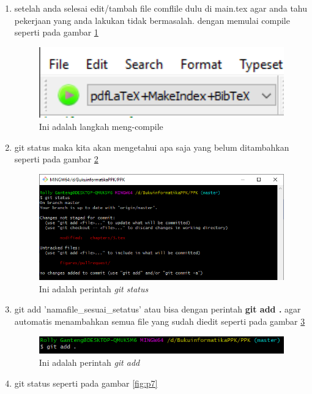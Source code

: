 \begin{enumerate}
\item setelah anda selesai edit/tambah file comflile dulu di main.tex agar anda tahu pekerjaan yang anda lakukan tidak bermasalah. dengan memulai compile seperti pada gambar \ref{fig:p4}
		\begin{figure}[H]
		\centering
		\includegraphics[width=1\textwidth]{figures/pullrequest/p4.PNG}
		\caption{Ini adalah langkah meng-compile}
		\label{fig:p4}
		\end{figure}
\item git status maka kita akan mengetahui apa saja yang belum ditambahkan seperti pada gambar \ref{fig:p5}
		\begin{figure}[H]
		\centering
		\includegraphics[width=1\textwidth]{figures/pullrequest/p5.PNG}
		\caption{Ini adalah perintah \textit{git status}}
		\label{fig:p5}
		\end{figure}
\item git add 'namafile\_sesuai\_setatus' atau bisa dengan perintah \textbf{git add .} agar automatis menambahkan semua file yang sudah diedit seperti pada gambar \ref{fig:p6}
		\begin{figure}[H]
		\centering
		\includegraphics[width=1\textwidth]{figures/pullrequest/p6.PNG}
		\caption{Ini adalah perintah \textit{git add}}
		\label{fig:p6}
		\end{figure}
\item git status seperti pada gambar \ref{fig:p7}

\end{enumerate}
